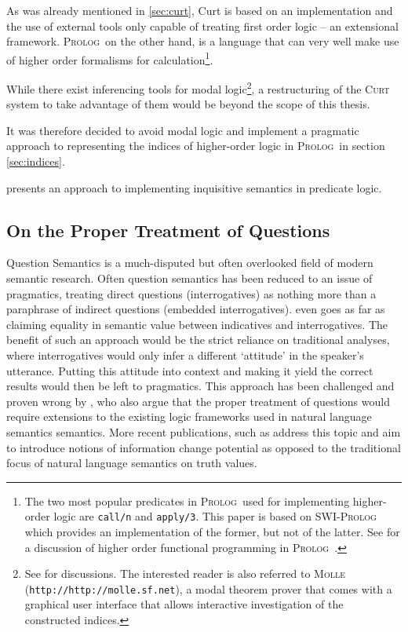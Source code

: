 \documentclass[a4paper,fontsize=12pt]{article}
\newcommand{\term}{\textsf} %
\newcommand{\code}{\texttt} %
\newcommand{\pn}{\textsc} %
\newcommand{\url}[1]{\code{http://#1}} %
\newcommand{\prol}{\pn{Prolog}\mbox{ }}
\theoremstyle{remark} \newtheorem*{termin}{Definition} %
\begin{document}
As was already mentioned in \ref{sec:curt}, Curt is based on an
implementation and the use of external tools only capable of treating first
order logic -- an extensional framework. \prol on the other hand, is a language
that can very well make use of higher order formalisms for
calculation\footnote{The two most popular predicates in \prol used for
implementing higher-order logic are
\code{call/n} and \code{apply/3}. This paper is based on \pn{SWI-Prolog} which
provides an implementation of the former, but not of the latter. See
\cite{naish:prolhio} for a discussion of higher order functional programming in
\prol.}.

While there exist inferencing tools for modal logic\footnote{See %
for discussions. The interested reader is also referred to \pn{Molle}
(\url{http://molle.sf.net}), a modal theorem prover that comes with a graphical user
interface that allows interactive investigation of the constructed indices.},
a restructuring of the \pn{Curt} system to take advantage of them would be
beyond the scope of this thesis.

It was therefore decided to avoid modal logic and implement a pragmatic approach
to representing the indices of higher-order logic in \prol in section
\ref{sec:indices}.

\cite{g:is} presents an approach to implementing inquisitive semantics in
predicate logic.

\subsection{On the Proper Treatment of Questions}

Question Semantics is a much-disputed but often overlooked field of modern
semantic research. Often question semantics has been reduced to an issue of
pragmatics, treating direct questions (interrogatives) as nothing more than a
paraphrase of indirect questions (embedded interrogatives).\cite{tichy}
even goes as far as claiming equality in semantic value between
indicatives and interrogatives. The benefit of such an approach would be the
strict reliance on traditional analyses, where interrogatives would only infer a
different `attitude' in the speaker's utterance. Putting this attitude into
context and making it yield the correct results would then be left to
pragmatics.
This approach has been challenged and proven wrong by \cite{gs:q},
who also argue that the proper treatment of questions would require extensions
to the existing logic frameworks used in natural language semantics semantics.
More recent publications, such as \cite{gal:tmbi}
address this topic and aim to introduce notions of \term{information change
potential} as opposed to the traditional focus of natural language semantics on
\term{truth values}.
\end{document}
